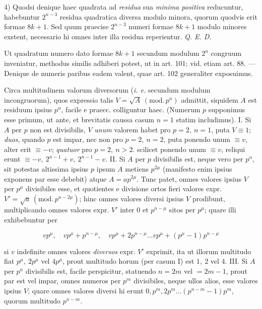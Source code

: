 4) Quodsi denique haec quadrata ad \emph{residua} sua \emph{minima positiva} reducuntur, habebuntur $2^{n-3}$ residua quadratica diversa modulo minora, quorum quodvis erit formae $8k+1$. Sed quum praecise $2^{n-3}$ numeri formae $8k+1$ modulo minores exstent, necessario hi omnes inter illa residua reperientur. \emph{Q. E. D.}

Ut quadratum numero dato formae $8k+1$ secundum modulum $2^n$ congruum inveniatur, methodus similis adhiberi potest, ut in art. 101; vid. etiam art. 88. --- Denique de numeris paribus eadem valent, quae art. 102 generaliter exposuimus.


Circa multitudinem valorum diversorum (\emph{i. e.} secundum modulum incongruorum), quos expressio talis $V=\surd A\,(\mathrm{mod.}\,p^n)$ admittit, siquidem $A$ est residuum ipsius $p^n$, facile e praecc. colliguntur haec. (Numerum $p$ supponimus esse primum, ut ante, et brevitatis caussa casum $n=1$ statim includimus). I. Si $A$ per $p$ non est divisibilis, $V$ \emph{unum} valorem habet pro $p=2,\ n=1$, puta $V \equiv1$; \emph{duos}, quando $p$ est impar, nec non pro $p=2,\ n=2$, puta ponendo unum $\equiv v$, alter erit $\equiv-v$; \emph{quatuor} pro $p=2,\ n>2$. scilicet ponendo unum $\equiv v$, reliqui erunt $\equiv-v,\ 2^{n-1}+v,\ 2^{n-1}-v$. II. Si $A$ per $p$ divisibilis est, neque vero per $p^n$, sit potestas altissima ipsius $p$ ipsum $A$ metiens $p^{2\mu}$ (manifesto enim ipsius exponens par esse debebit) atque $A=ap^{2\mu}$. Tunc patet, omnes valores ipsius $V$ per $p^\mu$ divisibiles esse, et quotientes e divisione ortos fieri valores expr. $V'=\surd a\,(\mathrm{mod.}\,p^{n-2\mu})$; hinc omnes valores diversi ipsius $V$ prodibunt, multiplicando omnes valores expr. $V'$ inter $0$ et $p^{n-\mu}$ sitos per $p^\mu$; quare illi exhibebuntur per

\[
vp^\mu,\quad
vp^\mu+p^{n-\mu},\quad
vp^\mu+2p^{n-\mu}\ldots vp^\mu+(p^\mu-1)p^{n-\mu}
\]

si $v$ indefinite omnes valores \emph{diversos} expr. $V'$ exprimit, ita ut illorum multitudo fiat $p^\mu,\ 2p^\mu$ vel $4p^\mu$, prout multitudo horum (per casum I) est $1,\ 2$ vel $4$. III. Si $A$ per $p^n$ divisibilis est, facile perspicitur, statuendo $n=2m$ vel $=2m-1$, prout par est vel impar, omnes numeros per $p^m$ divisibiles, neque ullos alios, esse valores ipsius $V$; quare omnes valores diversi hi erunt $0,p^m,2p^m\ldots(p^{n-m}-1)p^m$, quorum multitudo $p^{n-m}$.

